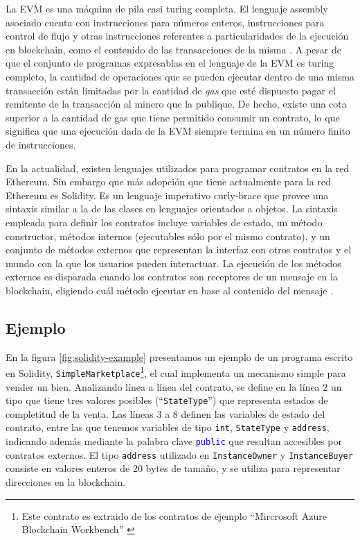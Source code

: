 La EVM es una máquina de pila casi turing completa.
El lenguaje assembly asociado cuenta con instrucciones para números enteros, instrucciones para control de flujo y otras instrucciones referentes a particularidades de la ejecución en blockchain, como el contenido de las transacciones de la misma \cite{evm-opcodes}.
A pesar de que el conjunto de programas expresablas en el lenguaje de la EVM es turing completo, la cantidad de operaciones que se pueden ejecutar dentro de una misma transacción están limitadas por la cantidad de \textit{gas} que esté dispuesto pagar el remitente de la transacción al minero que la publique.
De hecho, existe una cota superior a la cantidad de gas que tiene permitido consumir un contrato, lo que significa que una ejecución dada de la EVM siempre termina en un número finito de instrucciones.

En la actualidad, existen lenguajes utilizados para programar contratos en la red Ethereum.
Sin embargo que más adopción que tiene actualmente para la red Ethereum es Solidity.
Es un lenguaje imperativo curly-brace que provee una sintaxis similar a la de las clases en lenguajes orientados a objetos.
La sintaxis empleada para definir los contratos incluye variables de estado, un método constructor, métodos internos (ejecutables sólo por el mismo contrato), y  un conjunto de métodos externos que representan la interfaz con otros contratos y el mundo con la que los usuarios pueden interactuar.
La ejecución de los métodos externos es disparada cuando los contratos son receptores de un mensaje en la blockchain, eligiendo cuál método ejecutar en base al contenido del mensaje \cite{??}. %

\subsection{Ejemplo}
En la figura \ref{fig:solidity-example} presentamos un ejemplo de un programa escrito en Solidity, \texttt{SimpleMarketplace}\footnote{Este contrato es extraido de los contratos de ejemplo ``Mircrosoft Azure Blockchain Workbench'' \cite{azure-benchmark}}, el cual implementa un mecanismo simple para vender un bien.
Analizando línea a línea del contrato, se define en la línea 2 un tipo que tiene tres valores posibles (``\texttt{StateType}'') que representa estados de completitud de la venta.
Las líneas 3 a 8 definen las variables de estado del contrato, entre las que tenemos variables de tipo \texttt{int}, \texttt{StateType} y \texttt{address}, indicando además mediante la palabra clave \textcolor{blue}{\texttt{public}} que resultan accesibles por contratos externos.
El tipo \texttt{address} utilizado en \texttt{InstanceOwner} y \texttt{InstanceBuyer} consiste en valores enteros de 20 bytes de tamaño, y se utiliza para representar direcciones en la blockchain.

